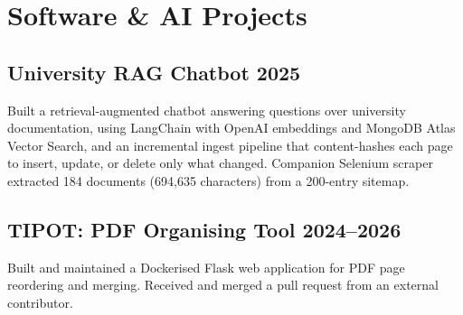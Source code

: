 \documentclass[10pt,a4paper]{article}
\begin{document}

\section*{Software \& AI Projects}

\subsection*{University RAG Chatbot \hfill 2025}
Built a retrieval-augmented chatbot answering questions over university
documentation, using LangChain with OpenAI embeddings and MongoDB Atlas Vector
Search, and an incremental ingest pipeline that content-hashes each page to
insert, update, or delete only what changed. Companion Selenium scraper
extracted 184 documents (694,635 characters) from a 200-entry sitemap.

\subsection*{TIPOT: PDF Organising Tool \hfill 2024--2026}
Built and maintained a Dockerised Flask web application for PDF page
reordering and merging. Received and merged a pull request from an external
contributor.
\end{document}

